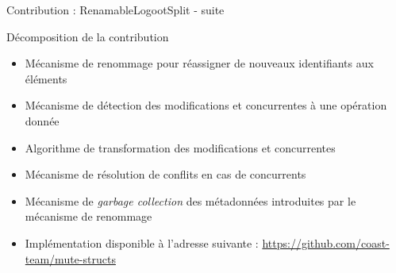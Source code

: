 \begin{frame}{Contribution : RenamableLogootSplit - suite}
    \begin{block}{Décomposition de la contribution}
        \begin{itemize}
            \item Mécanisme de renommage pour réassigner de nouveaux identifiants aux éléments
            \pause
            \item Mécanisme de détection des modifications \ins et \rmv concurrentes à une opération \ren donnée
            \item Algorithme de transformation des modifications \ins et \rmv concurrentes
            \pause
            \item Mécanisme de résolution de conflits en cas de \ren concurrents
            \pause
            \item Mécanisme de \emph{garbage collection} des métadonnées introduites par le mécanisme de renommage
        \end{itemize}
    \end{block}
    \pause
    \begin{itemize}
        \item Implémentation disponible à l'adresse suivante : \url{https://github.com/coast-team/mute-structs}
    \end{itemize}
\end{frame}
